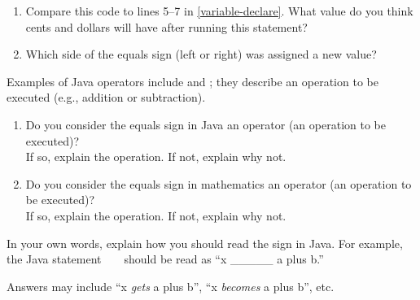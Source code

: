 \begin{enumerate}

\item Compare this code to lines 5--7 in \ref{variable-declare}.
What value do you think cents and dollars will have after running this statement?


\item Which side of the equals sign (left or right) was assigned a new value?

\end{enumerate}


\Q Examples of Java operators include \java{+} and \java{-}; they describe an operation to be executed (e.g., addition or subtraction).

\begin{enumerate}

\item Do you consider the equals sign in Java an operator (an operation to be executed)?
\\ If so, explain the operation. If not, explain why not.


\item Do you consider the equals sign in mathematics an operator (an operation to be executed)?
\\ If so, explain the operation. If not, explain why not.


\end{enumerate}


\Q In your own words, explain how you should read the \java{=} sign in Java.
For example, the Java statement ~  ~ should be read as ``x \_\_\_\_\_ a plus b.''

\begin{answer}
Answers may include ``x \emph{gets} a plus b'', ``x \emph{becomes} a plus b'', etc.
\end{answer}
